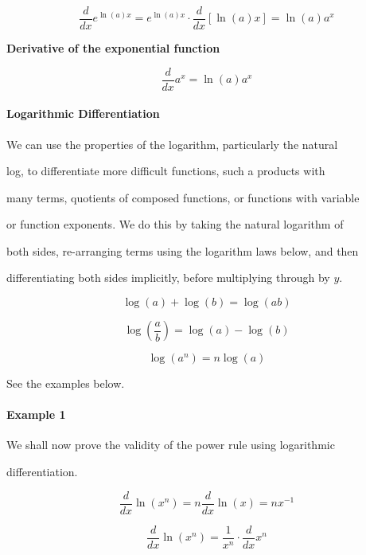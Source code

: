 $$\frac{d}{dx}e^{\ln(a)x}=e^{\ln(a)x}\cdot\frac{d}{dx}[\ln(a)x]=\ln(a)a^x$$



 \textbf{Derivative of the exponential function}

 $$\frac{d}{dx}a^x=\ln(a)a^x$$                





\paragraph{Logarithmic Differentiation}



We can use the properties of the logarithm, particularly the natural

log, to differentiate more difficult functions, such a products with

many terms, quotients of composed functions, or functions with variable

or function exponents. We do this by taking the natural logarithm of

both sides, re-arranging terms using the logarithm laws below, and then

differentiating both sides implicitly, before multiplying through by $y$.



 $$\log(a)+\log(b)=\log(ab)$$                     



 $$\log\left(\frac{a}{b}\right)=\log(a)-\log(b)$$ 



 $$\log(a^n)=n\log(a)$$                           



See the examples below.



\paragraph{Example 1}



We shall now prove the validity of the power rule using logarithmic

differentiation.



$$\frac{d}{dx}\ln(x^n)=n\frac{d}{dx}\ln(x)=nx^{-1}$$



$$\frac{d}{dx}\ln(x^n)=\frac{1}{x^n}\cdot\frac{d}{dx}x^n$$



